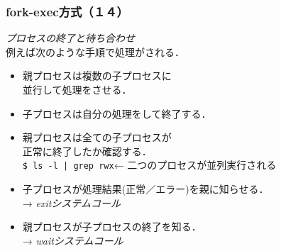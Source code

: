 \documentclass{beamer}                 %
\begin{document}
\begin{frame}[fragile]
  \frametitle{fork-exec方式（１４）}
  \emph{プロセスの終了と待ち合わせ}\\
  \vfill
  例えば次のような手順で処理がされる．
  \begin{itemize}
  \item 親プロセスは複数の子プロセスに\\並行して処理をさせる．
  \item 子プロセスは自分の処理をして終了する．
  \item 親プロセスは全ての子プロセスが\\正常に終了したか確認する．\\
    \vfill
    \verb;$ ls -l | grep rwx;\hfil ←  \hfil 二つのプロセスが並列実行される
    \vfill
  \item 子プロセスが処理結果(正常／エラー)を親に知らせる．\\
    → \emph{exitシステムコール}
  \item 親プロセスが子プロセスの終了を知る． \\
    → \emph{waitシステムコール}
  \end{itemize}
\end{frame}
\end{document}
